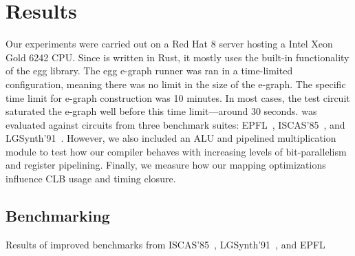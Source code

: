 \section{Results}\label{sec:results}
Our experiments were carried out on a Red Hat 8 server hosting a Intel Xeon
Gold 6242 CPU. Since \shortname{} is written in Rust, it mostly uses the
built-in functionality of the egg library. The egg e-graph runner was ran in a
time-limited configuration, meaning there was no limit in the size of the
e-graph. The specific time limit for e-graph construction was 10 minutes. In
most cases, the test circuit saturated the e-graph well before this time
limit---around 30 seconds. \shortname{} was evaluated against circuits from
three benchmark suites: EPFL~\cite{epflbench}, ISCAS'85~\cite{iscasbench}, and
LGSynth'91~\cite{lgsynthbench}. However, we also included an ALU and pipelined
multiplication module to test how our compiler behaves with increasing levels
of bit-parallelism and register pipelining. Finally, we measure how our mapping
optimizations influence CLB usage and timing closure.

\subsection{Benchmarking}\label{sec:results:benchmark}
\begin{table}
    \centering
    \caption{Results of \nimproved{} improved benchmarks from ISCAS'85~\cite{iscasbench}, LGSynth'91~\cite{lgsynthbench}, and EPFL~\cite{epflbench}}\label{tab:results}
\end{table}

